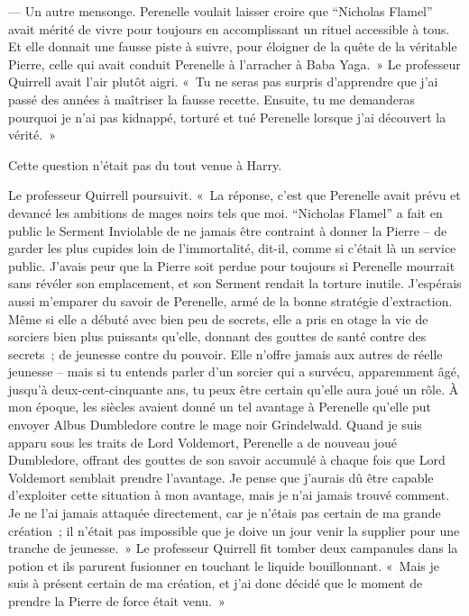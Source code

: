 --- Un autre mensonge. Perenelle voulait laisser croire que “Nicholas Flamel” avait mérité de vivre pour toujours en accomplissant un rituel accessible à tous. Et elle donnait une fausse piste à suivre, pour éloigner de la quête de la véritable Pierre, celle qui avait conduit Perenelle à l'arracher à Baba Yaga.~» Le professeur Quirrell avait l'air plutôt aigri. «~Tu ne seras pas surpris d'apprendre que j'ai passé des années à maîtriser la fausse recette. Ensuite, tu me demanderas pourquoi je n'ai pas kidnappé, torturé et tué Perenelle lorsque j'ai découvert la vérité.~»

Cette question n'était pas du tout venue à Harry.

Le professeur Quirrell poursuivit. «~La réponse, c'est que Perenelle avait prévu et devancé les ambitions de mages noirs tels que moi. “Nicholas Flamel” a fait en public le Serment Inviolable de ne jamais être contraint à donner la Pierre -- de garder les plus cupides loin de l'immortalité, dit-il, comme si c'était là un service public. J'avais peur que la Pierre soit perdue pour toujours si Perenelle mourrait sans révéler son emplacement, et son Serment rendait la torture inutile. J'espérais aussi m'emparer du savoir de Perenelle, armé de la bonne stratégie d'extraction. Même si elle a débuté avec bien peu de secrets, elle a pris en otage la vie de sorciers bien plus puissants qu'elle, donnant des gouttes de santé contre des secrets~; de jeunesse contre du pouvoir. Elle n'offre jamais aux autres de réelle jeunesse -- mais si tu entends parler d'un sorcier qui a survécu, apparemment âgé, jusqu'à deux-cent-cinquante ans, tu peux être certain qu'elle aura joué un rôle. À mon époque, les siècles avaient donné un tel avantage à Perenelle qu'elle put envoyer Albus Dumbledore contre le mage noir Grindelwald. Quand je suis apparu sous les traits de Lord Voldemort, Perenelle a de nouveau joué Dumbledore, offrant des gouttes de son savoir accumulé à chaque fois que Lord Voldemort semblait prendre l'avantage. Je pense que j'aurais dû être capable d'exploiter cette situation à mon avantage, mais je n'ai jamais trouvé comment. Je ne l'ai jamais attaquée directement, car je n'étais pas certain de ma grande création~; il n'était pas impossible que je doive un jour venir la supplier pour une tranche de jeunesse.~» Le professeur Quirrell fit tomber deux campanules dans la potion et ils parurent fusionner en touchant le liquide bouillonnant. «~Mais je suis à présent certain de ma création, et j'ai donc décidé que le moment de prendre la Pierre de force était venu.~»

